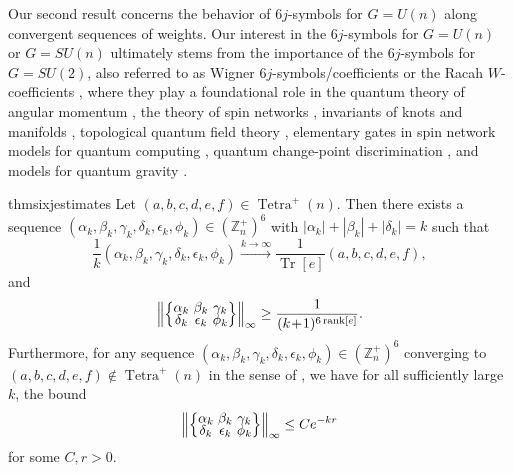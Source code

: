 \documentclass[notitlepage, 11pt, letterpaper]{amsart}
\theoremstyle{plain}
\theoremstyle{definition}
\let\cref\crtcref
\DeclareMathOperator{\Tr}{Tr}
\DeclareMathOperator{\Tetra}{Tetra}
\DeclareMathOperator{\rank}{rank}
\newcommand{\polyk}[1]{(k\!+\!1)^{#1}}
\newcommand{\norm}[1]{\left\lVert#1\right\rVert}
\newcommand{\abs}[1]{\left|#1\right|}
\newcommand{\undomweightsp}[1]{\mathbb Z^{+}_{#1}}
\newcommand{\ea}{a}
\newcommand{\eb}{b}
\newcommand{\ec}{c}
\newcommand{\ed}{d}
\newcommand{\ee}{e}
\newcommand{\ef}{f}
\newcommand{\ya}{\alpha}
\newcommand{\yb}{\beta}
\newcommand{\yc}{\gamma}
\newcommand{\yd}{\delta}
\newcommand{\ye}{\epsilon}
\newcommand{\yf}{\phi}
\newcommand{\tightcurlysixj}[1]{
\begingroup
\arraycolsep=1.5pt
\renewcommand{\arraystretch}{0.3}
\left\{\!\begin{array}{ccc}
    #1
\end{array}\!\right\}
\endgroup
}
\begin{document}
Our second result concerns the behavior of $6j$-symbols for $G=U(n)$ along convergent sequences of weights.
Our interest in the $6j$-symbols for $G=U(n)$ or $G=SU(n)$ ultimately stems from the importance of the $6j$-symbols for $G=SU(2)$, also referred to as Wigner $6j$-symbols/coefficients \cite{wigner1993matrices} or the Racah $W$-coefficients \cite{racah1942theory},
where they play a foundational role in the quantum theory of angular momentum \cite{varshalovich1988quantum,edmonds1996angular,aquilanti2012semiclassical}, the theory of spin networks \cite{penrose1971applications, baez2010physics, baez1996spin}, invariants of knots and manifolds \cite{reshetikhin1987quantized, turaev1992state}, topological quantum field theory \cite{durhuus1993topological}, elementary gates in spin network models for quantum computing \cite{marzuoli2005computing}, quantum change-point discrimination \cite{akimoto2011discrimination}, and models for quantum gravity \cite{baez1999introduction,barrett1998relativistic,barrett2003geometrical,rovelli2004quantum,moussouris1984quantum}.
\begin{restatable}{thm}{sixjestimates}
    \label{thm:6j_estimates}
    Let $(\ea, \eb, \ec, \ed, \ee, \ef) \in \Tetra^+(n)$.
    Then there exists a sequence
    $(\ya_k, \yb_k, \yc_k, \yd_k, \ye_k, \yf_k) \in (\undomweightsp{n})^6$ with $\abs{\ya_k}+\abs{\yb_k}+\abs{\yd_k} = k$ such that
    \begin{equation}
        \label{eq:young_diagram_convergence}
        \frac{1}{k} (\ya_k, \yb_k, \yc_k, \yd_k, \ye_k, \yf_k)
        \stackrel{k \to \infty}{\longrightarrow}
        \frac{1}{\Tr[e]} (\ea, \eb, \ec, \ed, \ee, \ef),
    \end{equation}
    and
    \begin{equation}
        \label{eq:n_independent_inverse_poly}
        \norm{\tightcurlysixj{ \ya_k & \yb_k & \yc_k \\ \yd_k &  \ye_k &  \yf_k}}_{\infty} \geq \frac{1}{\polyk{6\rank[\ee]}}.
    \end{equation}
    Furthermore, for any sequence $(\ya_k, \yb_k, \yc_k, \yd_k, \ye_k, \yf_k) \in (\undomweightsp{n})^6$ converging to $(\ea, \eb, \ec, \ed, \ee, \ef) \not \in \Tetra^{+}(n)$ in the sense of \cref{eq:young_diagram_convergence}, we have for all sufficiently large $k$, the bound
    \begin{equation}
        \norm{\tightcurlysixj{ \ya_k & \yb_k & \yc_k \\ \yd_k &  \ye_k &  \yf_k}}_{\infty} \leq C e^{-kr}
    \end{equation}
    for some $C, r > 0$.
\end{restatable}
\end{document}
